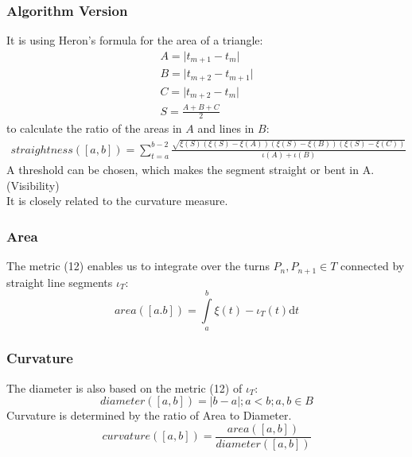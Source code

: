 \documentclass{article}
\newcommand\norm[1]{\left\lVert#1\right\rVert}
\begin{document}
\subsubsection{Algorithm Version}
It is using Heron's formula for the area of a triangle:
\begin{align*}
A=\lvert t_{m+1}-t_{m} \rvert\\
B=\lvert t_{m+2} - t_{m+1} \rvert\\
C=\lvert t_{m+2} - t_{m} \rvert\\
S=\frac{A+B+C}{2}
\end{align*}
to calculate the ratio of the areas in $A$ and lines in $B$:
\begin{align}
straightness([a,b])=\sum_{t=a}^{b-2}\frac{\sqrt{\xi(S)(\xi(S)-\xi(A))(\xi(S)-\xi(B))(\xi(S)-\xi(C))}}{\iota(A)+\iota(B)}
\end{align}
\fi
A threshold can be chosen, which makes the segment straight or bent in A. (Visibility)\\
It is closely related to the curvature measure.

\subsubsection{Area}
The metric (12) enables us to integrate over the turns $P_{n},P_{n+1} \in T$ connected by straight line segments $\iota_{T}$:
\begin{equation}
area([a.b])=\int \limits _{a}^{b} \xi(t)-\iota_{T}(t) \mathrm{d}t
\end{equation}
\iffalse
\subsubsection{Algorithm Version}
The integral of the area in the legal segment, so that:
\begin{align}
area([a,b])= \int \limits _{\xi'_{x}(a)}^{\xi'_{x}(b)} \xi'_{y}(t)\mathrm{d}t
\end{align}
\fi

\subsubsection{Curvature}
\iffalse
Because the diameter has to be calculated piece-wise, we have to set up a vector space with the turns $P_{n},P_{n+1} \in T$.
\begin{equation}
v \in (B,\norm{\cdot})
\end{equation}
Note: It is a Banach space.\\
\fi
The diameter is also based on the metric (12) of $\iota_{T}$:
\begin{equation}
diameter([a,b])=\lvert b-a \rvert; a < b; a,b \in B
\end{equation}
Curvature is determined by the ratio of Area to Diameter.
\begin{equation}
curvature([a,b]) = \frac{area([a,b])}{diameter([a,b])}
\end{equation}
\end{document}

